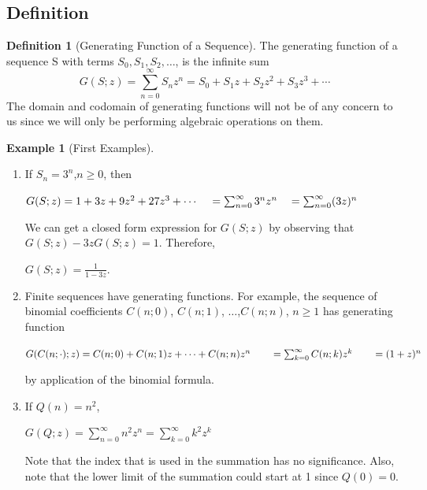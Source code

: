 \documentclass[10pt,]{book}
\theoremstyle{plain}
\theoremstyle{definition}
\newtheorem{definition}[theorem]{Definition}
\theoremstyle{definition}
\theoremstyle{definition}
\newtheorem{example}[theorem]{Example}
\theoremstyle{definition}
\numberwithin{equation}{section}
\begin{document}
\subsection[Definition]{Definition}\label{ss-what-is-a-generating-function}
\begin{definition}[Generating Function of a Sequence]\label{def-generating-function}
\label{notation-2}
The generating function of a sequence S with terms \(S_0,S_1 ,S_2, \dots \),  is the infinite sum
 \[G(S;z)=\sum_{n=0}^{\infty} S_n z^n=S_0+S_1 z+S_2 z^2+S_3 z^3+\cdots\]
The domain and codomain of generating functions will not be of any concern to us since we will only be performing algebraic operations on them.%
\end{definition}
\begin{example}[First Examples]\label{ex-first-gf-examples}
\leavevmode%
\begin{enumerate}[label=\alph*]
\item\hypertarget{li-117}{} If \(S_n = 3^n\),\(n \geq  0\), then

\(G(S;z) = 1 + 3z + 9z^2 + 27z^3 +\cdots \\
\\
\quad =\sum_{n=0}^{\infty} 3^n z^n\\
\\
\quad =\sum_{n=0}^{\infty} (3 z)^n\)

We can get a closed form expression for \(G(S;z)\) by observing that \(G(S;z) - 3z G(S;z) = 1\). Therefore,

\(G(S;z) =\frac{1}{1-3 z}\).%
\item\hypertarget{li-118}{}Finite sequences have generating functions. For example, the sequence of binomial coefficients \(C(n; 0)\), \(C(n; 1)\), \(\ldots\),\(C(n;
n)\), \(n \geq  1\) has generating function

\(G(C(n; \cdot ); z) = C(n; 0) + C(n; 1)z +\cdots  + C(n; n)z^n\\
\\
\quad \quad = \sum_{k=0}^{\infty} C(n;k) z^k\\
\\
\quad \quad =(1+z)^n\)

by application of the binomial formula.%
\item\hypertarget{li-119}{} If \(Q(n) = n^2\),

\(G(Q;z)=\sum_{n=0}^{\infty} n^2 z^n=\sum_{k=0}^{\infty} k^2 z^k\)

Note that the index that is used in the summation has no significance. Also, note that the lower limit of the summation could start at 1 since \(Q(0)=0\).%
\end{enumerate}
%
\end{example}
\typeout{************************************************}
\typeout{************************************************}
\end{document}
